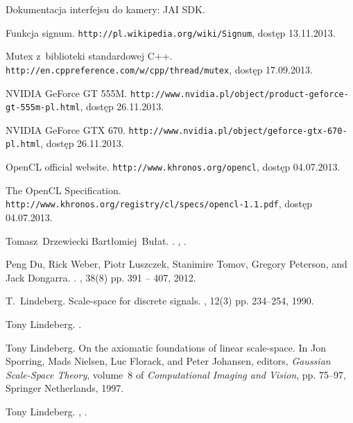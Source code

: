 \documentclass[pdflatex,11pt]{aghdpl}
\author{Tomasz Drzewiecki}
\date{2013}
\begin{document}
\titlepages

\tableofcontents
\clearpage










%
%
%
%


%

\begin{thebibliography}{10}

{Dokumentacja interfejsu do kamery: JAI SDK}.

Funkcja signum.
\newblock \texttt{http://pl.wikipedia.org/wiki/Signum}, dostęp 13.11.2013.

{Mutex z~biblioteki standardowej C++}.
\newblock \texttt{http://en.cppreference.com/w/cpp/thread/mutex}, dostęp 17.09.2013.

{NVIDIA GeForce GT 555M}.
\newblock \texttt{http://www.nvidia.pl/object/product-geforce-gt-555m-pl.html}, dostęp 26.11.2013.

{NVIDIA GeForce GTX 670}.
\newblock \texttt{http://www.nvidia.pl/object/geforce-gtx-670-pl.html}, dostęp 26.11.2013.

{OpenCL official website}.
\newblock \texttt{http://www.khronos.org/opencl}, dostęp 04.07.2013.

{The OpenCL Specification}.
\newblock \texttt{http://www.khronos.org/registry/cl/specs/opencl-1.1.pdf}, dostęp 04.07.2013.

Tomasz~Drzewiecki Bartłomiej~Bułat.
.
,
.

Peng Du, Rick Weber, Piotr Luszczek, Stanimire Tomov, Gregory Peterson, and
  Jack Dongarra.
.
, 38(8) pp. 391 -- 407, 2012.

T.~Lindeberg.
\newblock Scale-space for discrete signals.
, 12(3) pp. 234--254, 1990.

Tony Lindeberg.
.

Tony Lindeberg.
\newblock On the axiomatic foundations of linear scale-space.
\newblock In Jon Sporring, Mads Nielsen, Luc Florack, and Peter Johansen,
  editors, {\em Gaussian Scale-Space Theory}, volume~8 of {\em Computational
  Imaging and Vision}, pp. 75--97, Springer Netherlands, 1997.

Tony Lindeberg.
,
.

\end{thebibliography}

%

\appendix






\end{document}
